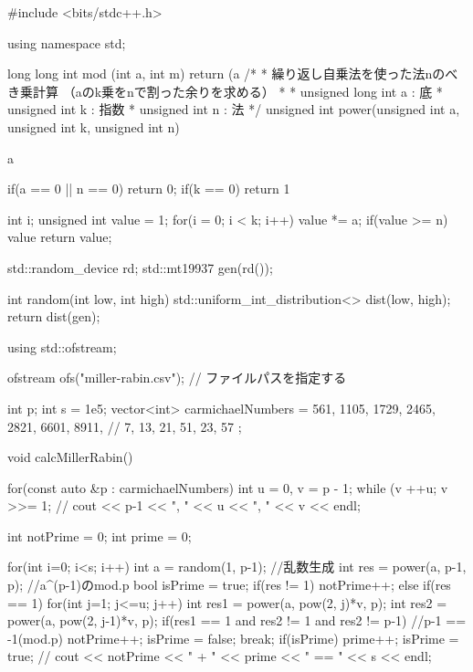 \documentclass[xelatex, 11pt, a4paper, ja=standard]{bxjsarticle}
\begin{document}
\begin{mylisting}[language=c++,caption=演習課題6のソースコード]
    #include <bits/stdc++.h>

using namespace std;

long long int mod (int a, int m){
    return (a%
}
/*
 * 繰り返し自乗法を使った法nのべき乗計算
 （aのk乗をnで割った余りを求める）
 * 
 * unsigned long int a : 底
 * unsigned int k : 指数
 * unsigned int n : 法
*/
unsigned int power(unsigned int a, unsigned int k, 
                                        unsigned int n) {

    a %

    if(a == 0 || n == 0){
        return 0;
    }
    if(k == 0){
        return 1 %
    }

    int i;
    unsigned int value = 1;
    for(i = 0; i < k; i++) {
        value *= a;
        if(value >= n) {
            value %
        }
    }
    return value;
}

std::random_device rd;
std::mt19937 gen(rd());

int random(int low, int high) {
    std::uniform_int_distribution<> dist(low, high);
    return dist(gen);
}

using std::ofstream;

ofstream ofs("miller-rabin.csv");  // ファイルパスを指定する


int p; 
int s = 1e5;
vector<int> carmichaelNumbers = {
    561, 1105, 1729, 2465, 2821, 6601, 8911,
    // 7, 13, 21, 51, 23, 57
}; 

void calcMillerRabin(){
    for(const auto &p : carmichaelNumbers){
        int u = 0, v = p - 1;
        while (v %
            ++u;
            v >>= 1;
        }
        // cout << p-1  << ", " << u << ", " << v << endl;

        int notPrime = 0;
        int prime = 0;
   
        for(int i=0; i<s; i++){
            int a = random(1, p-1); //乱数生成
            int res = power(a, p-1, p); //a^(p-1)のmod.p
            bool isPrime = true;
            if(res != 1){
                notPrime++;
            } else if(res == 1){
                for(int j=1; j<=u; j++){
                    int res1 = power(a, pow(2, j)*v, p);
                    int res2 = power(a, pow(2, j-1)*v, p);
                    if(res1 == 1 and res2 != 1 and res2 != p-1){ 
                        //p-1 == -1(mod.p)
                        notPrime++;
                        isPrime = false;
                        break;
                    }
                }
                if(isPrime) {
                    prime++;
                    isPrime = true;
                }
            }   
        }
        // cout << notPrime << " + " << prime << " == " << s << endl;

}
\end{mylisting}
\end{document}
